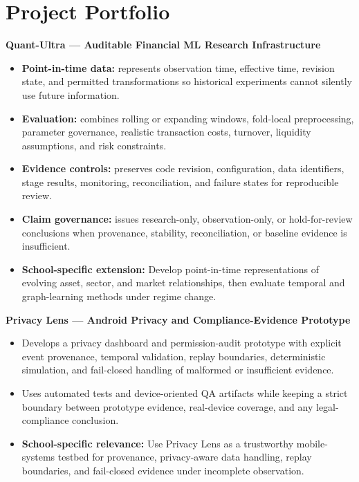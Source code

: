 \documentclass[11pt]{article}
\begin{document}
\section*{Project Portfolio}
\textbf{Quant-Ultra --- Auditable Financial ML Research Infrastructure}
\begin{itemize}
\item \textbf{Point-in-time data:} represents observation time, effective time, revision state, and permitted transformations so historical experiments cannot silently use future information.
\item \textbf{Evaluation:} combines rolling or expanding windows, fold-local preprocessing, parameter governance, realistic transaction costs, turnover, liquidity assumptions, and risk constraints.
\item \textbf{Evidence controls:} preserves code revision, configuration, data identifiers, stage results, monitoring, reconciliation, and failure states for reproducible review.
\item \textbf{Claim governance:} issues research-only, observation-only, or hold-for-review conclusions when provenance, stability, reconciliation, or baseline evidence is insufficient.
\item \textbf{School-specific extension:} Develop point-in-time representations of evolving asset, sector, and market relationships, then evaluate temporal and graph-learning methods under regime change.
\end{itemize}

\textbf{Privacy Lens --- Android Privacy and Compliance-Evidence Prototype}
\begin{itemize}
\item Develops a privacy dashboard and permission-audit prototype with explicit event provenance, temporal validation, replay boundaries, deterministic simulation, and fail-closed handling of malformed or insufficient evidence.
\item Uses automated tests and device-oriented QA artifacts while keeping a strict boundary between prototype evidence, real-device coverage, and any legal-compliance conclusion.
\item \textbf{School-specific relevance:} Use Privacy Lens as a trustworthy mobile-systems testbed for provenance, privacy-aware data handling, replay boundaries, and fail-closed evidence under incomplete observation.
\end{itemize}
\end{document}
